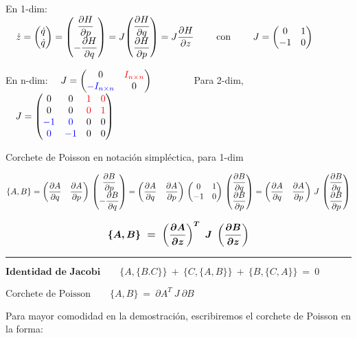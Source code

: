 \documentclass[a4paper,10pt]{article}
\begin{document}
En 1-dim: $\quad \dot z=\mqty(\dot q \\ \dot q) = \mqty( \displaystyle \pdv{H}{p} \\ \displaystyle -\pdv{H}{q} )= J \mqty( \displaystyle \pdv{H}{q} \\ \displaystyle \pdv{H}{p} )=J \displaystyle \pdv{H}{z} \qquad\text{ con } \qquad J=\mqty(0&1\\-1&0)$

En n-dim: $\quad J=\mqty(0&\textcolor{red}{I_{n\times n}} \\ \textcolor{blue}{-I_{n\times n}} &0)\qquad \qquad$
Para 2-dim, $\quad J=\mqty(0&0& \textcolor{red}{1} & \textcolor{red}{0}\\
0&0&\textcolor{red}{0}&\textcolor{red}{1} \\
\textcolor{blue}{-1} & \textcolor{blue}{0}&0&0 \\
\textcolor{blue}{0}&\textcolor{blue}{-1}&0&0 ) $




Corchete de Poisson en notación simpléctica, para 1-dim



$\{A,B\} =  \mqty( \displaystyle \pdv{A}{q}&\displaystyle \pdv{A}{p}) \ \mqty ( \displaystyle \pdv{B}{p}\\\displaystyle -\pdv{B}{q}) = \mqty(\displaystyle \pdv{A}{q}&\displaystyle \pdv{A}{p}) \ \mqty(0&1\\-1&0) \ \mqty(\displaystyle \pdv{B}{q} \\ \displaystyle \pdv{B}{p}) =\mqty( \displaystyle \pdv{A}{q}&\displaystyle \pdv{A}{p}) \ J \ \mqty(\displaystyle \pdv{B}{q} \\ \displaystyle \pdv{B}{p})$


$$\boldsymbol{
\{A,B\} \ = \displaystyle \  \left( \pdv{A}{z} \right)^T \ J \ \left( \pdv{B}{z} \right)
}$$

\begin{flushright}\rule{200pt}{0.1pt}\end{flushright}


\vspace{5mm}

$\textbf{Identidad de Jacobi} \qquad \{A,\{B.C\}\} \ + \ \{C,\{A,B\}\} \ + \  \{B,\{C,A\}\} \ = \ 0$

$\text{Corchete de Poisson} \qquad \{A,B\} \ = \ \partial A^T \ J \ \partial B$
 
\vspace{5mm}

Para mayor comodidad en la demostración, escribiremos el corchete de Poisson en la forma: 
\end{document}
